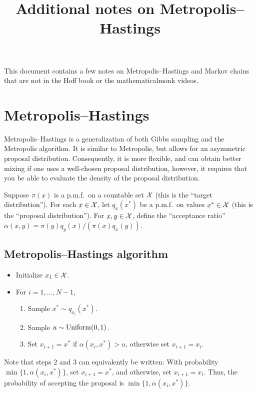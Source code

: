 \documentclass[12pt]{article}
\title{Additional notes on Metropolis--Hastings}
\author{}
\date{}
\begin{document}
\maketitle
\thispagestyle{firststyle}


This document contains a few notes on Metropolis--Hastings and Markov chains that are not in the Hoff book or the mathematicalmonk videos.


\section*{Metropolis--Hastings}

Metropolis--Hastings is a generalization of both Gibbs sampling and the Metropolis algorithm. It is similar to Metropolis, but allows for an asymmetric proposal distribution. Consequently, it is more flexible, and can obtain better mixing if one uses a well-chosen proposal distribution, however, it requires that you be able to evaluate the density of the proposal distribution.

Suppose $\pi(x)$ is a p.m.f.\ on a countable set $\mathcal{X}$ (this is the ``target distribution''). For each $x\in\mathcal{X}$, let $q_x(x^*)$ be a p.m.f.\ on values $x^*\in\mathcal{X}$ (this is the ``proposal distribution''). For $x,y\in\mathcal{X}$, define the ``acceptance ratio'' $\alpha(x,y) = \pi(y)q_y(x) / (\pi(x)q_x(y))$.

\subsection*{Metropolis--Hastings algorithm}
\begin{itemize}
\item Initialize $x_1\in\mathcal{X}$.
\item For $i = 1,\ldots,N-1$,
\begin{enumerate}
\item Sample $x^*\sim q_{x_i}(x^*)$.
\item Sample $u\sim\operatorname*{Uniform}(0,1)$.
\item Set $x_{i+1} = x^*$ if $\alpha(x_i,x^*) > u$, otherwise set $x_{i+1} = x_i$.
\end{enumerate}
\end{itemize}

Note that steps 2 and 3 can equivalently be written: 
With probability $\min\{1,\alpha(x_i,x^*)\}$, set $x_{i +1} = x^*$, and otherwise, set $x_{i +1} = x_i$.
Thus, the probability of accepting the proposal is $\min\{1,\alpha(x_i,x^*)\}$.
\end{document}
